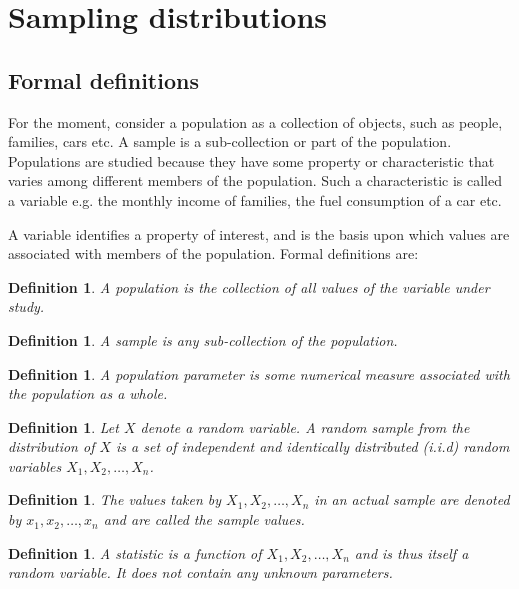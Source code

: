 \documentclass[12pt]{article}
\newtheorem{definition}[theorem]{Definition}
\begin{document}
\newpage
\section{Sampling distributions}
\subsection{Formal definitions}
For the moment, consider a population as a collection of objects, such as people, families, cars etc.  A sample is a sub-collection or part of the population.  Populations are studied because they have some property or characteristic that varies among different members of the population.  Such a characteristic is called a variable e.g. the monthly income of families, the fuel consumption of a car etc.

A variable identifies a property of interest, and is the basis upon which values are associated with members of the population.  Formal definitions are:
\begin{definition}
A \emph{population} is the collection of all values of the variable under study.
\end{definition}
\begin{definition}
A \emph{sample} is any sub-collection of the population.
\end{definition}
\begin{definition}
A \emph{population parameter} is some numerical measure associated with the population as a whole.
\end{definition}
\begin{definition}
Let $X$ denote a random variable. A \emph{random sample from the distribution} of $X$   is a set of independent and identically distributed (i.i.d) random variables $X_{1},X_{2},\ldots,X_{n}$.
\end{definition}
\begin{definition}
The values taken by $X_{1},X_{2},\ldots,X_{n}$ in an actual sample are denoted by $x_{1},x_{2},\ldots,x_{n}$ and are called the \emph{sample values}.
\end{definition}
\begin{definition}
A \emph{statistic} is a function of $X_{1},X_{2},\ldots,X_{n}$  and is thus itself a random variable.  It does not contain any unknown parameters.
\end{definition}
\end{document}
